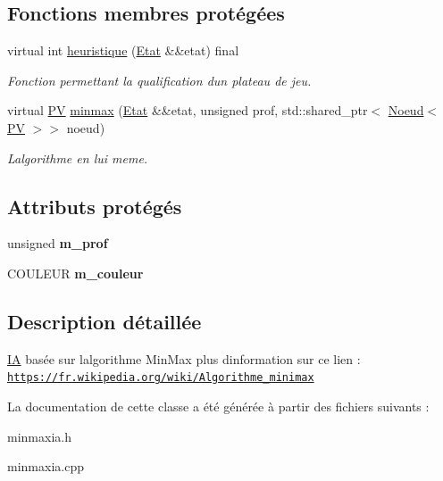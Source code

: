 \subsection*{Fonctions membres protégées}
\begin{DoxyCompactItemize}
\item 
virtual int \hyperlink{classMinMaxIA_a3261d2cb9a7105d930a0e67722f4289f}{heuristique} (\hyperlink{structEtat}{Etat} \&\&etat) final\hypertarget{classMinMaxIA_a3261d2cb9a7105d930a0e67722f4289f}{}\label{classMinMaxIA_a3261d2cb9a7105d930a0e67722f4289f}

\begin{DoxyCompactList}\small\item\em Fonction permettant la qualification d\textquotesingle{}un plateau de jeu. \end{DoxyCompactList}\item 
virtual \hyperlink{structIA_1_1PV}{PV} \hyperlink{classMinMaxIA_a15caae3b6117d717bb6c72dd97acc7c6}{minmax} (\hyperlink{structEtat}{Etat} \&\&etat, unsigned prof, std\+::shared\+\_\+ptr$<$ \hyperlink{classNoeud}{Noeud}$<$ \hyperlink{structIA_1_1PV}{PV} $>$$>$ noeud)\hypertarget{classMinMaxIA_a15caae3b6117d717bb6c72dd97acc7c6}{}\label{classMinMaxIA_a15caae3b6117d717bb6c72dd97acc7c6}

\begin{DoxyCompactList}\small\item\em L\textquotesingle{}algorithme en lui meme. \end{DoxyCompactList}\end{DoxyCompactItemize}
\subsection*{Attributs protégés}
\begin{DoxyCompactItemize}
\item 
unsigned {\bfseries m\+\_\+prof}\hypertarget{classMinMaxIA_aab16a043c48ab6b300cdabf8d67c32ec}{}\label{classMinMaxIA_aab16a043c48ab6b300cdabf8d67c32ec}

\item 
C\+O\+U\+L\+E\+UR {\bfseries m\+\_\+couleur}\hypertarget{classMinMaxIA_a9dd148bfadb7fd84d7392ece6669d841}{}\label{classMinMaxIA_a9dd148bfadb7fd84d7392ece6669d841}

\end{DoxyCompactItemize}


\subsection{Description détaillée}
\hyperlink{classIA}{IA} basée sur l\textquotesingle{}algorithme Min\+Max plus d\textquotesingle{}information sur ce lien \+: \href{https://fr.wikipedia.org/wiki/Algorithme_minimax}{\tt https\+://fr.\+wikipedia.\+org/wiki/\+Algorithme\+\_\+minimax} 

La documentation de cette classe a été générée à partir des fichiers suivants \+:\begin{DoxyCompactItemize}
\item 
minmaxia.\+h\item 
minmaxia.\+cpp\end{DoxyCompactItemize}
